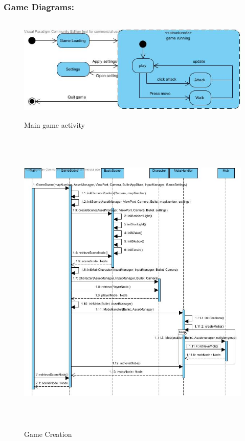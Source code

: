 \documentclass[letterpaper]{article}
\begin{document}
				\subsubsection*{Game Diagrams:}
				\vspace{0.1in}
					
					\begin{figure}[H]
					\centering
					\includegraphics[width=180mm, height=50mm]{UML_Diagram/Activity/GameUpdate_Activity.jpg}
					\caption{Main game activity}
					\label{overflow}
					\end{figure}
					
					\begin{figure}[H]
					\centering
					\includegraphics[width=180mm, height=150mm]{UML_Diagram/Sequence/Game_Creation.jpg}
					\caption{Game Creation}
					\label{overflow}
					\end{figure}
					
\end{document}
